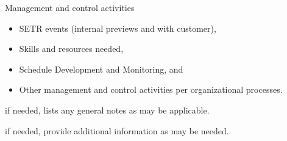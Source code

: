 \begin{description}[itemindent=5pt,topsep=0pt,itemsep=0pt,partopsep=0pt, parsep=0pt]
	\item[Section 6] Management and control activities
		\begin{itemize}[topsep=0pt,itemsep=0pt,partopsep=0pt, parsep=0pt]
			\item SETR events (internal previews and with customer),
			\item Skills and resources needed,
			\item Schedule Development and Monitoring, and
			\item Other management and control activities per organizational processes.
		\end{itemize}
	\item[Section 7] if needed, lists any general notes as may be applicable.
	\item[Appendices] if needed, provide additional information as may be needed.
\end{description}


